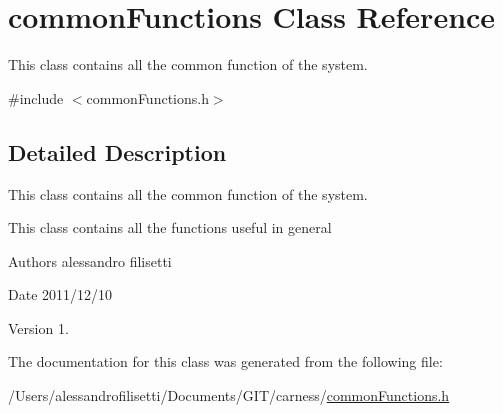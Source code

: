 \hypertarget{classcommon_functions}{\section{common\-Functions Class Reference}
\label{classcommon_functions}
}


This class contains all the common function of the system.  




{\ttfamily \#include $<$common\-Functions.\-h$>$}



\subsection{Detailed Description}
This class contains all the common function of the system. 

This class contains all the functions useful in general \begin{DoxyAuthor}{Authors}
alessandro filisetti 
\end{DoxyAuthor}
\begin{DoxyDate}{Date}
2011/12/10 
\end{DoxyDate}
\begin{DoxyVersion}{Version}
1. 
\end{DoxyVersion}


The documentation for this class was generated from the following file\-:\begin{DoxyCompactItemize}
\item 
/\-Users/alessandrofilisetti/\-Documents/\-G\-I\-T/carness/\hyperlink{common_functions_8h}{common\-Functions.\-h}\end{DoxyCompactItemize}
